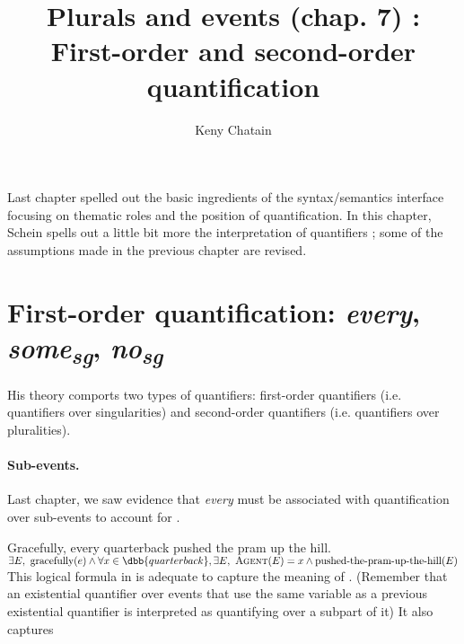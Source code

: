 



\endofdump

\newcommand{\scale}{1}

\title{Plurals and events (chap. 7) : First-order and second-order quantification}
\author{Keny Chatain}


\maketitle

Last chapter spelled out the basic ingredients of the syntax/semantics interface focusing on thematic roles and the position of quantification. In this chapter, Schein spells out a little bit more the interpretation of quantifiers ; some of the assumptions made in the previous chapter are revised.


\section{First-order quantification: \emph{every}, \emph{some\textsubscript{sg}}, \emph{no\textsubscript{sg}}}
%
His theory comports two types of quantifiers: first-order quantifiers (i.e. quantifiers over singularities) and second-order quantifiers (i.e. quantifiers over pluralities). 

\paragraph{Sub-events.} Last chapter, we saw evidence that \emph{every} must be associated with quantification over sub-events to account for \cnextxa.

\pex
\a
Gracefully, every quarterback pushed the pram up the hill.
\a
$\exists E,\ \text{gracefully}(e) \wedge \forall x\in\dbb{quarterback}, \exists E,\ \textsc{Agent}(E) = x \wedge \text{pushed-the-pram-up-the-hill}(E)$ 
\xe
%
This logical formula in \clastxb is adequate to capture the meaning of \clastxa. (Remember that an existential quantifier over events that use the same variable as a previous existential quantifier is interpreted as quantifying over a subpart of it) It also captures


